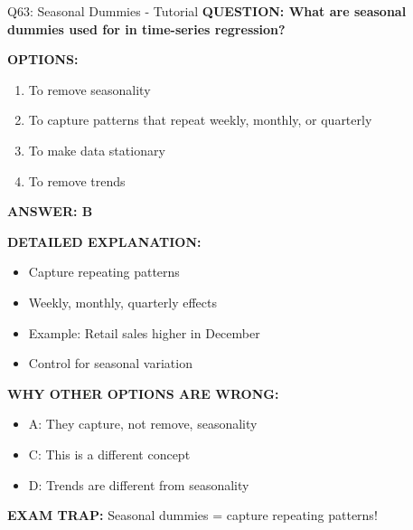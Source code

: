 \documentclass[8pt]{beamer}
\begin{document}
	\begin{frame}{Q63: Seasonal Dummies - Tutorial}
		\fontsize{6.5}{7.5}\selectfont
		\textbf{QUESTION: What are seasonal dummies used for in time-series regression?}
		
		\vspace{0.1cm}
		\textbf{OPTIONS:}
		\begin{enumerate}
			\item To remove seasonality
			\item To capture patterns that repeat weekly, monthly, or quarterly
			\item To make data stationary
			\item To remove trends
		\end{enumerate}
		
		\vspace{0.1cm}
		\textcolor{myblue}{\textbf{ANSWER: B}}
		
		\vspace{0.1cm}
		\textbf{DETAILED EXPLANATION:}
		\begin{itemize}
			\item Capture repeating patterns
			\item Weekly, monthly, quarterly effects
			\item Example: Retail sales higher in December
			\item Control for seasonal variation
		\end{itemize}
		
		\vspace{0.1cm}
		\textcolor{myred}{\textbf{WHY OTHER OPTIONS ARE WRONG:}}
		\begin{itemize}
			\item \textcolor{myred}{A:} They capture, not remove, seasonality
			\item \textcolor{myred}{C:} This is a different concept
			\item \textcolor{myred}{D:} Trends are different from seasonality
		\end{itemize}
		
		\textcolor{myred}{\textbf{EXAM TRAP:}} Seasonal dummies = \textcolor{myblue}{capture repeating patterns}!
	\end{frame}
	
\end{document}
